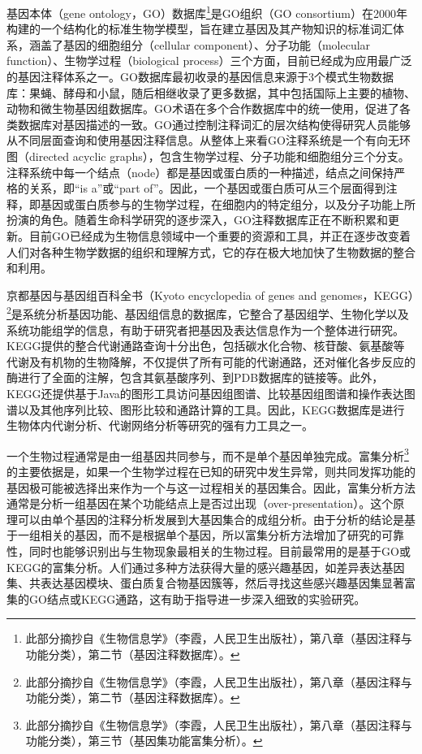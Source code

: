 \documentclass[11pt,a4paper,twoside]{book}
\begin{document}
基因本体（gene ontology，GO）数据库\footnote{此部分摘抄自《生物信息学》（李霞，人民卫生出版社），第八章（基因注释与功能分类），第二节（基因注释数据库）。}是GO组织（GO consortium）在2000年构建的一个结构化的标准生物学模型，旨在建立基因及其产物知识的标准词汇体系，涵盖了基因的细胞组分（cellular component）、分子功能（molecular function）、生物学过程（biological process）三个方面，目前已经成为应用最广泛的基因注释体系之一。GO数据库最初收录的基因信息来源于3个模式生物数据库：果蝇、酵母和小鼠，随后相继收录了更多数据，其中包括国际上主要的植物、动物和微生物基因组数据库。GO术语在多个合作数据库中的统一使用，促进了各类数据库对基因描述的一致。GO通过控制注释词汇的层次结构使得研究人员能够从不同层面查询和使用基因注释信息。从整体上来看GO注释系统是一个有向无环图（directed acyclic graphs），包含生物学过程、分子功能和细胞组分三个分支。注释系统中每一个结点（node）都是基因或蛋白质的一种描述，结点之间保持严格的关系，即“is a”或“part of”。因此，一个基因或蛋白质可从三个层面得到注释，即基因或蛋白质参与的生物学过程，在细胞内的特定组分，以及分子功能上所扮演的角色。随着生命科学研究的逐步深入，GO注释数据库正在不断积累和更新。目前GO已经成为生物信息领域中一个重要的资源和工具，并正在逐步改变着人们对各种生物学数据的组织和理解方式，它的存在极大地加快了生物数据的整合和利用。

京都基因与基因组百科全书（Kyoto encyclopedia of genes and genomes，KEGG）\footnote{此部分摘抄自《生物信息学》（李霞，人民卫生出版社），第八章（基因注释与功能分类），第二节（基因注释数据库）。}是系统分析基因功能、基因组信息的数据库，它整合了基因组学、生物化学以及系统功能组学的信息，有助于研究者把基因及表达信息作为一个整体进行研究。KEGG提供的整合代谢通路查询十分出色，包括碳水化合物、核苷酸、氨基酸等代谢及有机物的生物降解，不仅提供了所有可能的代谢通路，还对催化各步反应的酶进行了全面的注解，包含其氨基酸序列、到PDB数据库的链接等。此外，KEGG还提供基于Java的图形工具访问基因组图谱、比较基因组图谱和操作表达图谱以及其他序列比较、图形比较和通路计算的工具。因此，KEGG数据库是进行生物体内代谢分析、代谢网络分析等研究的强有力工具之一。

一个生物过程通常是由一组基因共同参与，而不是单个基因单独完成。富集分析\footnote{此部分摘抄自《生物信息学》（李霞，人民卫生出版社），第八章（基因注释与功能分类），第三节（基因集功能富集分析）。}的主要依据是，如果一个生物学过程在已知的研究中发生异常，则共同发挥功能的基因极可能被选择出来作为一个与这一过程相关的基因集合。因此，富集分析方法通常是分析一组基因在某个功能结点上是否过出现（over-presentation）。这个原理可以由单个基因的注释分析发展到大基因集合的成组分析。由于分析的结论是基于一组相关的基因，而不是根据单个基因，所以富集分析方法增加了研究的可靠性，同时也能够识别出与生物现象最相关的生物过程。目前最常用的是基于GO或KEGG的富集分析。人们通过多种方法获得大量的感兴趣基因，如差异表达基因集、共表达基因模块、蛋白质复合物基因簇等，然后寻找这些感兴趣基因集显著富集的GO结点或KEGG通路，这有助于指导进一步深入细致的实验研究。
\end{document}
